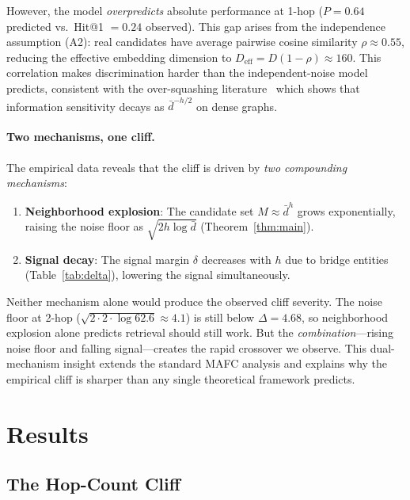 \documentclass[11pt]{article}
\begin{document}
However, the model \textit{overpredicts} absolute performance at 1-hop ($P = 0.64$ predicted vs.\ Hit@1 $= 0.24$ observed). This gap arises from the independence assumption (A2): real candidates have average pairwise cosine similarity $\rho \approx 0.55$, reducing the effective embedding dimension to $D_{\text{eff}} = D(1 - \rho) \approx 160$. This correlation makes discrimination harder than the independent-noise model predicts, consistent with the over-squashing literature~\citep{alon2021,digiovanni2023} which shows that information sensitivity decays as $\bar{d}^{-h/2}$ on dense graphs.

\paragraph{Two mechanisms, one cliff.} The empirical data reveals that the cliff is driven by \textit{two compounding mechanisms}:
\begin{enumerate}
    \item \textbf{Neighborhood explosion}: The candidate set $M \approx \bar{d}^h$ grows exponentially, raising the noise floor as $\sqrt{2h \log \bar{d}}$ (Theorem~\ref{thm:main}).
    \item \textbf{Signal decay}: The signal margin $\delta$ decreases with $h$ due to bridge entities (Table~\ref{tab:delta}), lowering the signal simultaneously.
\end{enumerate}
Neither mechanism alone would produce the observed cliff severity. The noise floor at 2-hop ($\sqrt{2 \cdot 2 \cdot \log 62.6} \approx 4.1$) is still below $\Delta = 4.68$, so neighborhood explosion alone predicts retrieval should still work. But the \textit{combination}---rising noise floor and falling signal---creates the rapid crossover we observe. This dual-mechanism insight extends the standard MAFC analysis and explains why the empirical cliff is sharper than any single theoretical framework predicts.

\section{Results}

\subsection{The Hop-Count Cliff}
\end{document}
